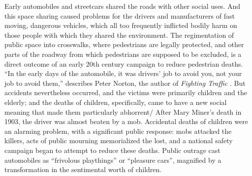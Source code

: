Early automobiles and streetcars shared the roads with other social
uses. And this space sharing caused problems for the drivers and
manufacturers of fast moving, dangerous vehicles, which all too
frequently inflicted bodily harm on those people with which they
shared the environment. The regimentation of public space into
crosswalks, where pedestrians are legally protected, and other parts
of the roadway from which pedestrians are supposed to be excluded, is
a direct outcome of an early 20th century campaign to reduce
pedestrian deaths. ``In the early days of the automobile, it was
drivers' job to avoid you, not your job to avoid them,'' describes
Peter Norton, the author of \emph{Fighting Traffic}
\cite{???-http://www.vox.com/2015/1/15/7551873/jaywalking-history}.
But accidents nevertheless occurred, and the victims were primarily
children and the elderly\cite{???-vox}; and the deaths of children,
specifically, came to have a new social meaning that made them
particularly abhorrent\cite{???-zelizer}/ 
After Mary Miner's death in 1903, the driver was almost beaten by a
mob\cite[p. 22]{???-zelizer}. Accidental deaths of children were an
alarming problem, with a significant public response:  mobs attacked
the killers, acts of public mourning memorialized the lost, and a
national safety campaign began to attempt to reduce these
deaths\cite[p. 23]{???-zelizer}. Public outrage cast automobiles as
``frivolous playthings'' or ``pleasure cars''\cite{???-vox}, magnified
by a transformation in the sentimental worth of
children\cite[p. 23]{???-zelizer}. 


